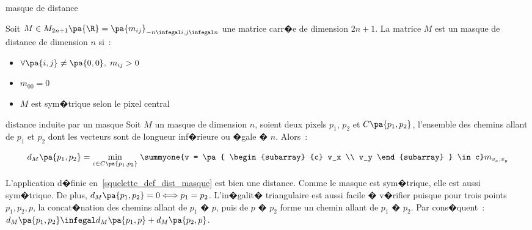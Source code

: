         \begin{xdefinition}{masque de distance}
        
        Soit $M \in M_{2n+1}\pa{\R} = \pa{m_{ij}}_{ -n \infegal i,j \infegal n}$ une matrice carr�e 
        de dimension $2n+1$. La matrice $M$ est un masque de distance de dimension $n$ si~:
        
                \begin{itemize}
                \item  $\forall \pa{i,j} \neq \pa{0,0}, \; m_{ij} > 0$
                \item  $m_{00} = 0$
                \item  $M$ est sym�trique selon le pixel central
                \end{itemize}
        
        \end{xdefinition}





            \begin{xdefinition}{distance induite par un masque}
            \label{squelette_def_dist_masque}
            Soit $M$ un masque de dimension $n$, soient deux pixels $p_1$, $p_2$ et $C\pa{p_1,p_2}$, 
            l'ensemble des chemins allant de $p_1$ et $p_2$ dont les vecteurs sont de longueur inf�rieure ou 
            �gale � $n$. Alors~:
            
                        $$
                        d_M\pa{p_1,p_2} = \underset{c \in C\pa{p_1,p_2}}{\min} \; \summyone{v = \pa{ \begin{subarray} {c}
                                    v_x \\ v_y \end{subarray} }
                                    \in c} m_{v_x, v_y}
                        $$
            
            \end{xdefinition}


L'application d�finie en~\ref{squelette_def_dist_masque} est bien une distance. Comme le masque est sym�trique, elle est aussi  sym�trique. De plus, $d_M\pa{p_1,p_2} = 0 \Longleftrightarrow p_1 = p_2$. L'in�galit� triangulaire est aussi facile � v�rifier puisque pour trois points $p_1,p_2,p$, la concat�nation des chemins allant de $p_1$ � $p$, puis de $p$ � $p_2$ forme un chemin allant de $p_1$ � $p_2$. Par cons�quent~: $d_M\pa{p_1,p_2} \infegal d_M\pa{p_1,p} + d_M\pa{p_2,p}$.

